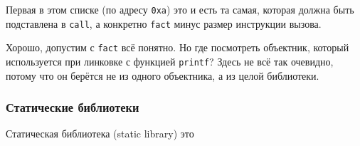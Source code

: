 \documentclass[a4paper,12pt,oneside]{article}
\begin{document}
Первая в этом списке (по адресу \lstinline!0xa!) это и есть та самая, которая должна быть подставлена в \lstinline!call!, а конкретно \lstinline!fact! минус размер инструкции вызова.

Хорошо, допустим с \lstinline!fact! всё понятно. Но где посмотреть объектник, который используется при линковке с функцией \lstinline!printf!? Здесь не всё так очевидно, потому что он берётся не из одного объектника, а из целой библиотеки.

\subsubsection{Статические библиотеки}

Статическая библиотека (static library) это 
\end{document}
